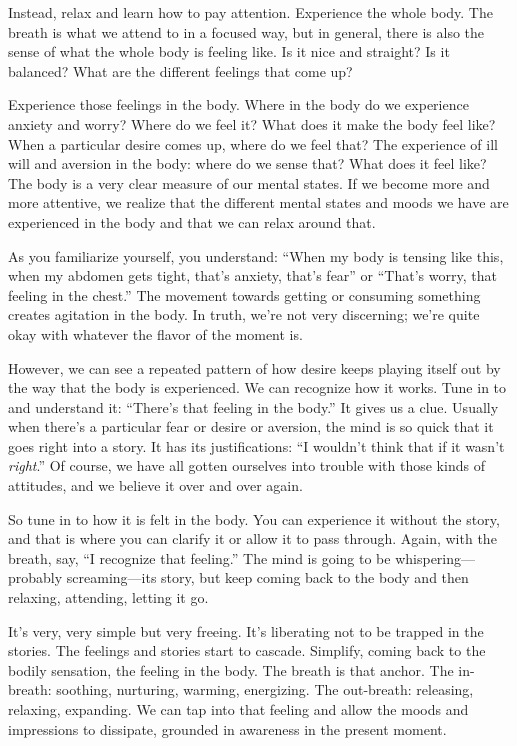 Instead, relax and learn how to pay attention. Experience the whole
body. The breath is what we attend to in a focused way, but in general,
there is also the sense of what the whole body is feeling like. Is it
nice and straight? Is it balanced? What are the different feelings that
come up?

Experience those feelings in the body. Where in the body do we
experience anxiety and worry? Where do we feel it? What does it make the
body feel like? When a particular desire comes up, where do we feel
that? The experience of ill will and aversion in the body: where do we
sense that? What does it feel like? The body is a very clear measure of
our mental states. If we become more and more attentive, we realize that
the different mental states and moods we have are experienced in the
body and that we can relax around that.

As you familiarize yourself, you understand: “When my body is tensing
like this, when my abdomen gets tight, that’s anxiety, that’s fear” or
“That’s worry, that feeling in the chest.” The movement towards getting
or consuming something creates agitation in the body. In truth, we’re
not very discerning; we’re quite okay with whatever the flavor of the
moment is.

However, we can see a repeated pattern of how desire keeps playing
itself out by the way that the body is experienced. We can recognize how
it works. Tune in to and understand it: “There’s that feeling in the
body.” It gives us a clue. Usually when there’s a particular fear or
desire or aversion, the mind is so quick that it goes right into a
story. It has its justifications: “I wouldn’t think that if it wasn’t
\emph{right}.” Of course, we have all gotten ourselves into trouble with
those kinds of attitudes, and we believe it over and over again.

So tune in to how it is felt in the body. You can experience it without
the story, and that is where you can clarify it or allow it to pass
through. Again, with the breath, say, “I recognize that feeling.” The
mind is going to be whispering—probably screaming—its story, but keep
coming back to the body and then relaxing, attending, letting it go.

It’s very, very simple but very freeing. It’s liberating not to be
trapped in the stories. The feelings and stories start to cascade.
Simplify, coming back to the bodily sensation, the feeling in the body.
The breath is that anchor. The in-breath: soothing, nurturing, warming,
energizing. The out-breath: releasing, relaxing, expanding. We can tap
into that feeling and allow the moods and impressions to dissipate,
grounded in awareness in the present moment.

